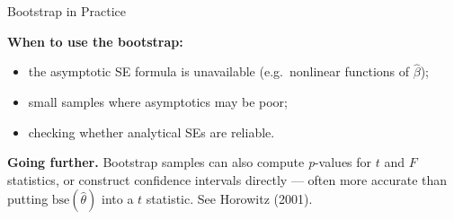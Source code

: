 \documentclass[aspectratio=169, 12pt]{beamer}
\begin{document}
\begin{frame}{Bootstrap in Practice}

  \begin{keybox}
    \textbf{When to use the bootstrap:}
    \begin{itemize}
      \item the asymptotic SE formula is unavailable (e.g.\ nonlinear functions of
        $\hat\beta$);
      \item small samples where asymptotics may be poor;
      \item checking whether analytical SEs are reliable.
    \end{itemize}
  \end{keybox}

  \medskip

  \begin{keybox}
    \textbf{Going further.} Bootstrap samples can also compute \textit{p}-values for $t$
    and $F$ statistics, or construct confidence intervals directly --- often more
    accurate than putting $\text{bse}(\hat{\theta})$ into a $t$ statistic. See
    Horowitz (2001).
  \end{keybox}

\end{frame}

\end{document}
